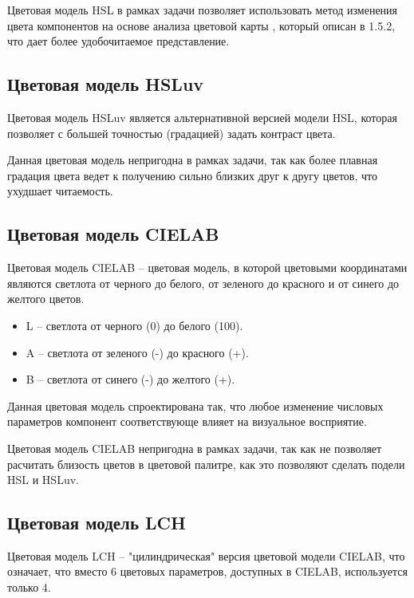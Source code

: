 Цветовая модель HSL в рамках задачи позволяет использовать метод изменения цвета компонентов на основе анализа цветовой карты \cite{colormap}, который описан в 1.5.2, что дает более удобочитаемое \cite{sitereadability} представление.

\subsection{Цветовая модель HSLuv}

Цветовая модель HSLuv является альтернативной версией модели HSL, которая позволяет с большей точностью (градацией) задать контраст цвета.

Данная цветовая модель непригодна в рамках задачи, так как более плавная градация цвета ведет к получению сильно близких друг к другу цветов, что ухудшает читаемость.

\subsection{Цветовая модель CIELAB}

Цветовая модель CIELAB -- цветовая модель, в которой цветовыми координатами являются светлота от черного до белого, от зеленого до красного и от синего до желтого цветов.

\begin{itemize}
	\item L -- светлота от черного (0) до белого (100).
	\item A -- светлота от зеленого (-) до красного (+).
	\item B -- светлота от синего (-) до желтого (+).
\end{itemize}

Данная цветовая модель спроектирована так, что любое изменение числовых параметров компонент соответствующе влияет на визуальное восприятие.

Цветовая модель CIELAB непригодна в рамках задачи, так как не позволяет расчитать близость цветов в цветовой палитре, как это позволяют сделать подели HSL и HSLuv.

\subsection{Цветовая модель LCH}

Цветовая модель LCH -- "цилиндрическая" версия цветовой модели CIELAB, что означает, что вместо 6 цветовых параметров, доступных в CIELAB, используется только 4.

